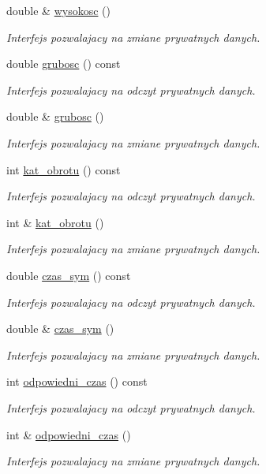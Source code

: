 \begin{DoxyCompactItemize}
double \& \hyperlink{class_zbiornik_af02cf0dac56cbb096a2e77e22f19afed}{wysokosc} ()
\begin{DoxyCompactList}\small\item\em Interfejs pozwalajacy na zmiane prywatnych danych. \end{DoxyCompactList}\item 
double \hyperlink{class_zbiornik_a34b0e660d8d6c4d1f45f06f5063b9788}{grubosc} () const 
\begin{DoxyCompactList}\small\item\em Interfejs pozwalajacy na odczyt prywatnych danych. \end{DoxyCompactList}\item 
double \& \hyperlink{class_zbiornik_a9a8f3d5b4fcc2ab626fb2a5602127810}{grubosc} ()
\begin{DoxyCompactList}\small\item\em Interfejs pozwalajacy na zmiane prywatnych danych. \end{DoxyCompactList}\item 
int \hyperlink{class_zbiornik_ab0a2ae2523139dadc52a9499a6c2ab98}{kat\-\_\-obrotu} () const 
\begin{DoxyCompactList}\small\item\em Interfejs pozwalajacy na odczyt prywatnych danych. \end{DoxyCompactList}\item 
int \& \hyperlink{class_zbiornik_a9f00e4eed1ba89fcf0307c80d7c2a961}{kat\-\_\-obrotu} ()
\begin{DoxyCompactList}\small\item\em Interfejs pozwalajacy na zmiane prywatnych danych. \end{DoxyCompactList}\item 
double \hyperlink{class_zbiornik_a94a4b32ae64aab4836be8c536358f612}{czas\-\_\-sym} () const 
\begin{DoxyCompactList}\small\item\em Interfejs pozwalajacy na odczyt prywatnych danych. \end{DoxyCompactList}\item 
double \& \hyperlink{class_zbiornik_abad8da28f2224b54c259c399bf68fc44}{czas\-\_\-sym} ()
\begin{DoxyCompactList}\small\item\em Interfejs pozwalajacy na zmiane prywatnych danych. \end{DoxyCompactList}\item 
int \hyperlink{class_zbiornik_ac0899810e0771b37ce815717d98190f7}{odpowiedni\-\_\-czas} () const 
\begin{DoxyCompactList}\small\item\em Interfejs pozwalajacy na odczyt prywatnych danych. \end{DoxyCompactList}\item 
int \& \hyperlink{class_zbiornik_afc80f37f2aaa84dd22dca5e4741f8495}{odpowiedni\-\_\-czas} ()
\begin{DoxyCompactList}\small\item\em Interfejs pozwalajacy na zmiane prywatnych danych. \end{DoxyCompactList}\end{DoxyCompactItemize}
